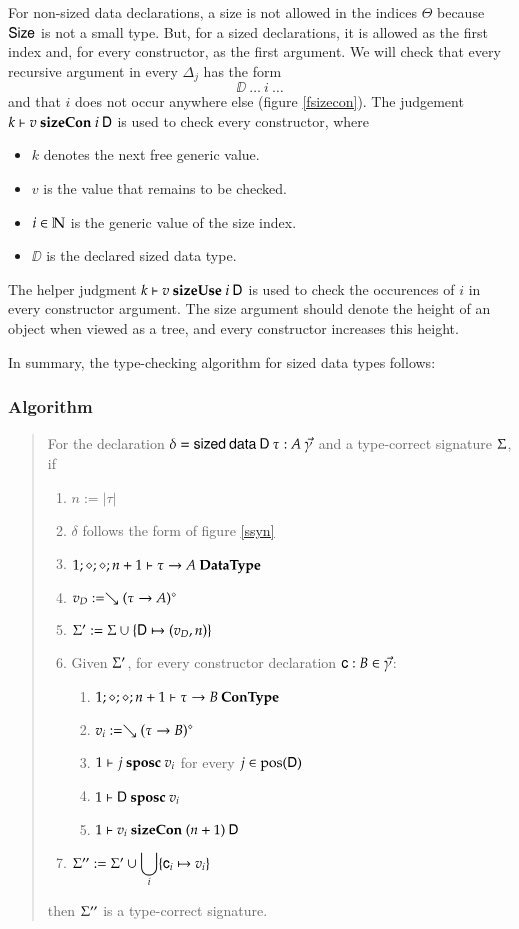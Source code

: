 \noindent For non-sized data declarations, a size is not allowed in the indices $\Theta$ because $\mathsf{Size}$ is not a small type.
But, for a sized declarations, it is allowed as the first index and, for every constructor, as the first argument.
We will check that every recursive argument in every $\Delta_j$ has the form \[\DD \: \ldots \: i \: \ldots \]
and that $i$ does not occur anywhere else (figure \ref{fsizecon}). 
The judgement $k\vdash v\mbox{ \textbf{sizeCon} }i\:\mathsf{D}$ is used to check every constructor, where
\begin{itemize}
\item
$k$ denotes the next free generic value.
\item
$v$ is the value that remains to be checked.
\item
$i \in \mathbb{N} $ is the generic value of the size index.
\item
$\DD$ is the declared sized data type.
\end{itemize}
The helper judgment $k\vdash v\mbox{ \textbf{sizeUse} }i\:\mathsf{D}$ is used to check the occurences of $i$ in every constructor argument.
The size argument should denote the height of an object when viewed as a tree, and every constructor increases this height.

\noindent In summary, the type-checking algorithm for sized data types follows: 
\subsubsection{Algorithm}
\begin{quote}
For the declaration $\delta = \mathsf{sized}\: \mathsf{data}\: \mathsf{D} \: \tau : A \: \vec{\gamma} $ 
and a type-correct signature $\Sigma$, if
\begin{enumerate}
\item
$ n := \vert\tau\vert$
\item
$\delta$ follows the form of figure \ref{ssyn}
\item
$1;\diamond;\diamond;n+1\vdash\tau \rightarrow A\:\mathbf{DataType}$
\item
$v_D := \searrow (\tau \rightarrow A)^{\diamond}$
\item
$\Sigma' := \Sigma \cup \{\mathsf{D} \mapsto (v_D,n)\}$
\item
Given $\Sigma'$, for every constructor declaration $\mathsf{c} : B  \in \vec{\gamma}$:
\begin{enumerate} 
\item
$1;\diamond;\diamond;n+1\vdash\tau \rightarrow B\:\mathbf{ConType}$
\item
$v_i := \searrow (\tau \rightarrow B)^{\diamond}$
\item
$1\vdash j\mbox{ \textbf{sposc} }v_i$ for every $j \in \mbox{pos}(\mathsf{D}) $ 
\item
$1\vdash\mathsf{D}\mbox{ \textbf{sposc} }v_i$
\item
$1\vdash v_i\mbox{ \textbf{sizeCon} }(n+1)\:\mathsf{D}$
\end{enumerate}
\item
$\Sigma'' := \Sigma' \cup \displaystyle\bigcup_{i}\{\mathsf{c}_i \mapsto v_i\}$
\end{enumerate}
then $\Sigma''$ is a type-correct signature.
\end{quote}

